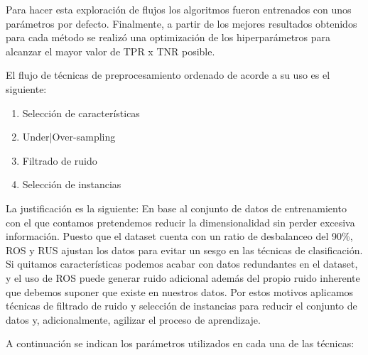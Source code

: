 Para hacer esta exploración de flujos los algoritmos fueron entrenados con unos parámetros por defecto. Finalmente, a partir de los mejores resultados obtenidos para cada método se realizó una optimización de los hiperparámetros para alcanzar el mayor valor de TPR x TNR posible.

\vspace{\baselineskip}

El flujo de técnicas de preprocesamiento ordenado de acorde a su uso es el siguiente:
\begin{enumerate}
    \item Selección de características
    \item Under|Over-sampling
    \item Filtrado de ruido
    \item Selección de instancias
\end{enumerate}

\vspace{\baselineskip}

La justificación es la siguiente: En base al conjunto de datos de entrenamiento con el que contamos pretendemos reducir la dimensionalidad sin perder excesiva información. Puesto que el dataset cuenta con un ratio de desbalanceo del 90\%, ROS y RUS ajustan los datos para evitar un sesgo en las técnicas de clasificación. Si quitamos características podemos acabar con datos redundantes en el dataset, y el uso de ROS puede generar ruido adicional además del propio ruido inherente que debemos suponer que existe en nuestros datos. Por estos motivos aplicamos técnicas de filtrado de ruido y selección de instancias para reducir el conjunto de datos y, adicionalmente, agilizar el proceso de aprendizaje. 

\vspace{\baselineskip}

A continuación se indican los parámetros utilizados en cada una de las técnicas:

